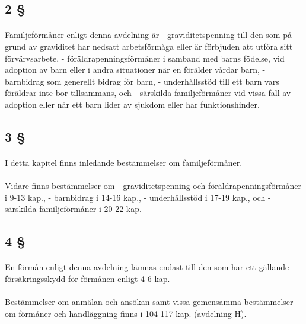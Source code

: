 \documentclass[a4paper,notitlepage,openany,10pt]{book}
\begin{document}
\subsection*{2 §}
\paragraph*{}
Familjeförmåner enligt denna avdelning är
\newline - graviditetspenning till den som på grund av graviditet har nedsatt arbetsförmåga eller är förbjuden att utföra sitt förvärvsarbete,
\newline - föräldrapenningsförmåner i samband med barns födelse, vid adoption av barn eller i andra situationer när en förälder vårdar barn,
\newline - barnbidrag som generellt bidrag för barn,
\newline - underhållsstöd till ett barn vars föräldrar inte bor tillsammans, och
\newline - särskilda familjeförmåner vid vissa fall av adoption eller när ett barn lider av sjukdom eller har funktionshinder.
\subsection*{3 §}
\paragraph*{}
I detta kapitel finns inledande bestämmelser om familjeförmåner.
\paragraph*{}
Vidare finns bestämmelser om
\newline - graviditetspenning och föräldrapenningsförmåner i 9-13 kap.,
\newline - barnbidrag i 14-16 kap.,
\newline - underhållsstöd i 17-19 kap., och
\newline - särskilda familjeförmåner i 20-22 kap.
\subsection*{4 §}
\paragraph*{}
En förmån enligt denna avdelning lämnas endast till den som har ett gällande försäkringsskydd för förmånen enligt 4-6 kap.
\paragraph*{}
Bestämmelser om anmälan och ansökan samt vissa gemensamma bestämmelser om förmåner och handläggning finns i 104-117 kap. (avdelning H).
\end{document}
